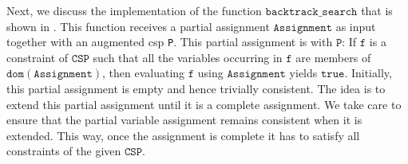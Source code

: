 Next, we discuss the implementation of the function $\texttt{backtrack\_search}$  that is shown in
.  This function receives a partial assignment
$\texttt{Assignment}$ as input together with an augmented \ac{csp} \texttt{P}.  This partial assignment is
 with $\texttt{P}$:  If $\texttt{f}$ is a constraint of $\texttt{CSP}$ such that
all the variables occurring in $\texttt{f}$ are members of $\texttt{dom}(\texttt{Assignment})$, then evaluating
$\texttt{f}$ using $\texttt{Assignment}$ yields $\texttt{true}$.  Initially, this partial assignment is empty
and hence trivially consistent.  The idea is to extend this partial assignment until it is a complete
assignment.  We take care to ensure that the partial variable assignment remains consistent when it is
extended.  This way, once the assignment is complete it has to satisfy all constraints of the given $\texttt{CSP}$.
